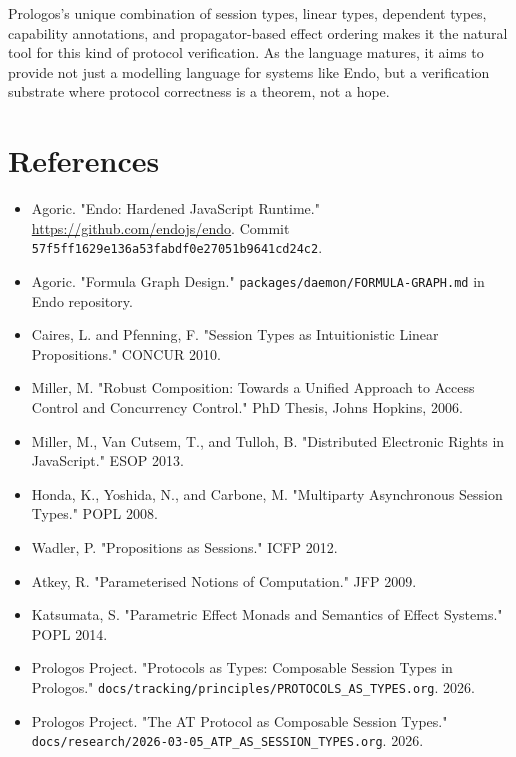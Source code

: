 \documentclass[11pt]{article}
\begin{document}
Prologos's unique combination of session types, linear types, dependent
types, capability annotations, and propagator-based effect ordering makes
it the natural tool for this kind of protocol verification. As the language
matures, it aims to provide not just a modelling language for systems like
Endo, but a verification substrate where protocol correctness is a theorem,
not a hope.
\section{References}
\label{sec:org7eea64a}

\begin{itemize}
\item Agoric. "Endo: Hardened JavaScript Runtime." \url{https://github.com/endojs/endo}.
Commit \texttt{57f5ff1629e136a53fabdf0e27051b9641cd24c2}.

\item Agoric. "Formula Graph Design." \texttt{packages/daemon/FORMULA-GRAPH.md} in Endo
repository.

\item Caires, L. and Pfenning, F. "Session Types as Intuitionistic Linear
Propositions." CONCUR 2010.

\item Miller, M. "Robust Composition: Towards a Unified Approach to Access
Control and Concurrency Control." PhD Thesis, Johns Hopkins, 2006.

\item Miller, M., Van Cutsem, T., and Tulloh, B. "Distributed Electronic
Rights in JavaScript." ESOP 2013.

\item Honda, K., Yoshida, N., and Carbone, M. "Multiparty Asynchronous Session
Types." POPL 2008.

\item Wadler, P. "Propositions as Sessions." ICFP 2012.

\item Atkey, R. "Parameterised Notions of Computation." JFP 2009.

\item Katsumata, S. "Parametric Effect Monads and Semantics of Effect Systems."
POPL 2014.

\item Prologos Project. "Protocols as Types: Composable Session Types in Prologos."
\texttt{docs/tracking/principles/PROTOCOLS\_AS\_TYPES.org}. 2026.

\item Prologos Project. "The AT Protocol as Composable Session Types."
\texttt{docs/research/2026-03-05\_ATP\_AS\_SESSION\_TYPES.org}. 2026.


\end{itemize}
\end{document}
